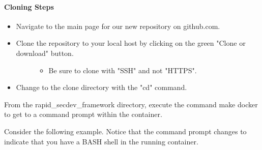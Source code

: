 \hypertarget{cloning-steps}{%
\paragraph{Cloning Steps}\label{cloning-steps}}

\begin{itemize}
\item
  Navigate to the main page for our new repository on github.com.
\item
  \begin{description}
  \item[Clone the repository to your local host by clicking on the green
  "Clone or download" button.]
  \begin{itemize}
  \tightlist
  \item
    Be sure to clone with "SSH" and not "HTTPS".
  \end{itemize}
  \end{description}
\item
  Change to the clone directory with the "cd" command.
\end{itemize}

From the rapid\_secdev\_framework directory, execute the command
make docker to get to a command prompt within the container.

Consider the following example. Notice that the command prompt changes
to indicate that you have a BASH shell in the running container.

\begin{Shaded}
\end{Shaded}

